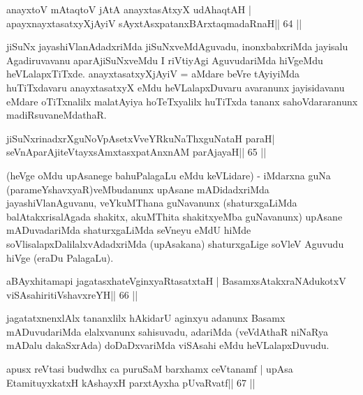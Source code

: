 \begin{shl}
anayxtoV mAtaqtoV jAtA anayxtasAtxyX udAhaqtAH |
apayxnayxtasatxyXjAyiV sAyxtAsxpatanxBArxtaqmadaRnaH\hfill || 64 ||
\end{shl}

\begin{artha}
jiSuNx jayashiVlanAdadxriMda jiSuNxveMdAguvadu, inonxbabxriMda jayisalu  Agadiruvavanu aparAjiSuNxveMdu I riVtiyAgi AguvudariMda hiVgeMdu heVLalapxTiTxde. anayxtasatxyXjAyiV = aMdare beVre tAyiyiMda huTiTxdavaru anayxtasatxyX eMdu heVLalapxDuvaru avaranunx jayisidavanu eMdare oTiTxnalilx malatAyiya hoTeTxyalilx huTiTxda tananx sahoVdararanunx madiRsuvaneMdathaR.
\end{artha}

\begin{shl}
jiSuNxrinadxrXguNoVpAsetxVveYRkuNaThxguNataH paraH|
seVnA\s parAjiteVtayxsAmxtasxpatAnxnAM parAjayaH\hfill || 65 ||
\end{shl}

\begin{artha}
(heVge oMdu upAsanege bahuPalagaLu eMdu keVLidare) - iMdarxna guNa (parameYshavxyaR)veMbudanunx upAsane mADidadxriMda jayashiVlanAguvanu, veYkuMThana guNavanunx (shaturxgaLiMda balAtakxrisalAgada shakitx, akuMThita shakitxyeMba guNavanunx) upAsane mADuvadariMda shaturxgaLiMda seVneyu eMdU hiMde soVlisalapxDalilalxvAdadxriMda (upAsakana) shaturxgaLige soVleV Aguvudu hiVge (eraDu PalagaLu).
\end{artha}


\begin{shl}
aBAyxhitamapi jagatasxhateV\s ginxyaRtasatxtaH |
BasamxsAtakxraNAdukotxV viSAsahiritiVshavxreYH\hfill || 66 ||
\end{shl}

\begin{artha}
jagatatxnenxlAlx tananxlilx hAkidarU aginxyu adanunx Basamx mADuvudariMda elalxvanunx sahisuvadu, adariMda (veVdAthaR niNaRya mADalu dakaSxrAda) doDaDxvariMda viSAsahi eMdu heVLalapxDuvudu.
\end{artha}


\begin{shl}
apusx reVtasi budwdhx ca puruSaM barxhamx ceVtanamf |
upAsa EtamituyxkatxH kAshayxH parxtAyxha pUvaRvatf\hfill || 67 ||
\end{shl}

